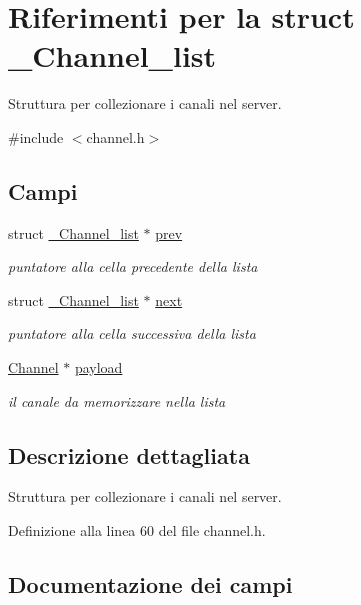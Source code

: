 \hypertarget{struct__Channel__list}{}\section{Riferimenti per la struct \+\_\+\+Channel\+\_\+list}
\label{struct__Channel__list}


Struttura per collezionare i canali nel server.  




{\ttfamily \#include $<$channel.\+h$>$}

\subsection*{Campi}
\begin{DoxyCompactItemize}
\item 
struct \hyperlink{struct__Channel__list}{\+\_\+\+Channel\+\_\+list} $\ast$ \hyperlink{struct__Channel__list_a7fc520dc8ea525f40d9b21d73d775c40}{prev}
\begin{DoxyCompactList}\small\item\em puntatore alla cella precedente della lista \end{DoxyCompactList}\item 
struct \hyperlink{struct__Channel__list}{\+\_\+\+Channel\+\_\+list} $\ast$ \hyperlink{struct__Channel__list_a21fee3d0440dadc87beb71cd1d4717f8}{next}
\begin{DoxyCompactList}\small\item\em puntatore alla cella successiva della lista \end{DoxyCompactList}\item 
\hyperlink{structChannel}{Channel} $\ast$ \hyperlink{struct__Channel__list_a0f42a32ae0c0b003e8802f2130d9dff9}{payload}
\begin{DoxyCompactList}\small\item\em il canale da memorizzare nella lista \end{DoxyCompactList}\end{DoxyCompactItemize}


\subsection{Descrizione dettagliata}
Struttura per collezionare i canali nel server. 

Definizione alla linea 60 del file channel.\+h.



\subsection{Documentazione dei campi}
\mbox{\label{struct__Channel__list_a21fee3d0440dadc87beb71cd1d4717f8}} 
